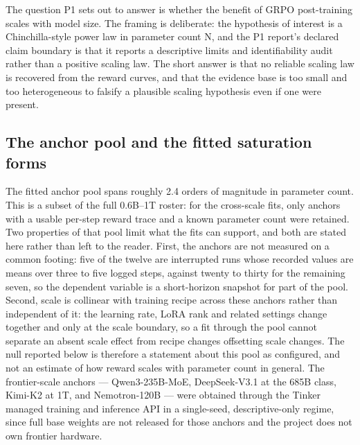 \documentclass[12pt,a4paper]{report}
\begin{document}
The question P1 sets out to answer is whether the benefit of GRPO
post-training scales with model size. The framing is deliberate: the
hypothesis of interest is a Chinchilla-style power law in parameter
count N, and the P1 report's declared claim boundary is that it reports
a descriptive limits and identifiability audit rather than a positive
scaling law. The short answer is that no reliable scaling law is
recovered from the reward curves, and that the evidence base is too
small and too heterogeneous to falsify a plausible scaling hypothesis
even if one were present.

\subsection{The anchor pool and the fitted saturation
forms}\label{the-anchor-pool-and-the-fitted-saturation-forms}

The fitted anchor pool spans roughly 2.4 orders of magnitude in
parameter count. This is a subset of the full 0.6B--1T roster: for the
cross-scale fits, only anchors with a usable per-step reward trace and a
known parameter count were retained. Two properties of that pool limit
what the fits can support, and both are stated here rather than left to
the reader. First, the anchors are not measured on a common footing:
five of the twelve are interrupted runs whose recorded values are means
over three to five logged steps, against twenty to thirty for the
remaining seven, so the dependent variable is a short-horizon snapshot
for part of the pool. Second, scale is collinear with training recipe
across these anchors rather than independent of it: the learning rate,
LoRA rank and related settings change together and only at the scale
boundary, so a fit through the pool cannot separate an absent scale
effect from recipe changes offsetting scale changes. The null reported
below is therefore a statement about this pool as configured, and not an
estimate of how reward scales with parameter count in general. The
frontier-scale anchors --- Qwen3-235B-MoE, DeepSeek-V3.1 at the 685B
class, Kimi-K2 at 1T, and Nemotron-120B --- were obtained through the
Tinker managed training and inference API in a single-seed,
descriptive-only regime, since full base weights are not released for
those anchors and the project does not own frontier hardware.
\end{document}
